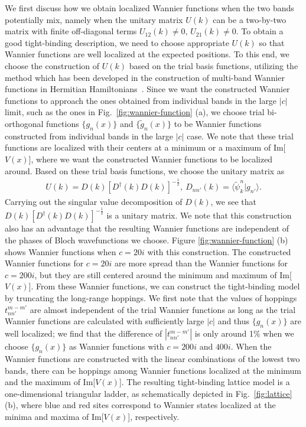 \documentclass[prb,superscriptaddress,floatfix,twocolumn,showpacs]{revtex4-2}
\begin{document}
We first discuss how we obtain localized Wannier functions when the two bands potentially mix, namely when the unitary matrix $U(k)$ can be a two-by-two matrix with finite off-diagonal terms $U_{12}(k)\neq0,\,U_{21}(k)\neq0$.
To obtain a good tight-binding description, we need to choose appropriate $U(k)$ so that Wannier functions are well localized at the expected positions.
To this end, we choose the construction of $U(k)$ based on the trial basis functions, utilizing the method which has been developed in the construction of multi-band Wannier functions in Hermitian Hamiltonians~\cite{marzani1997maximally,
souza2001maximally,
marzani2012maximally}.
Since we want the constructed Wannier functions to approach the ones obtained from individual bands in the large $|c|$ limit, such as the ones in Fig.~\ref{fig:wannier-function} (a), we choose trial bi-orthogonal functions $\{g_n(x)\}$ and $\{\tilde{g}_n(x)\}$ to be Wannier functions constructed from individual bands in the large $|c|$ case. We note that these trial functions are localized with their centers at a minimum or a maximum of Im[$V(x)$], where we want the constructed Wannier functions to be localized around.
Based on these trial basis functions, we choose the unitary matrix as
\begin{align}
    U(k)=D(k)[D^\dagger(k)D(k)]^{-\frac{1}{2}},\ 
    D_{nn'}(k)=\langle\tilde{\psi}_k^n|g_{n'}\rangle.
    \label{eq:guess-method}
\end{align}
Carrying out the singular value decomposition of $D(k)$, we see that $D(k)[D^\dagger(k)D(k)]^{-\frac{1}{2}}$ is a unitary matrix. 
We note that this construction also has an advantage that the resulting Wannier functions are independent of the phases of Bloch wavefunctions we choose.
Figure \ref{fig:wannier-function} (b) shows Wannier functions when $c=20i$ with this construction.
The constructed Wannier functions for $c = 20i$ are more spread than the Wannier functions for $c=200i$, but they are still centered around the minimum and maximum of Im[$V(x)$]. 
From these Wannier functions, we can construct the tight-binding model by truncating the long-range hoppings. 
We first note that the values of hoppings $t_{nn'}^{m-m'}$ are almost independent of the trial Wannier functions as long as the trial Wannier functions are calculated with sufficiently large $|c|$ and thus $\{g_n(x)\}$ are well localized; we find that the difference of $|t_{nn'}^{m-m'}|$ is only around 1\% when we choose $\{g_n(x)\}$ as Wannier functions with $c=200i$ and $400i$. 
When the Wannier functions are constructed with the linear combinations of the lowest two bands, there can be hoppings among Wannier functions localized at the minimum and the maximum of Im[$V(x)$]. 
The resulting tight-binding lattice model is a one-dimensional triangular ladder, as schematically depicted in Fig.~\ref{fig:lattice} (b), where blue and red sites correspond to Wannier states localized at the minima and maxima of Im[$V(x)$], respectively.
\end{document}
